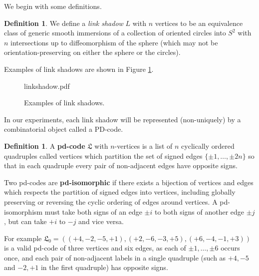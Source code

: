\documentclass[amsmath,secnumarabic,floatfix,amssymb,nofootinbib,nobibnotes,letterpaper,11pt,tightenlines,showkeys]{revtex4}
\theoremstyle{definition}
\newtheorem{definition}[theorem]{Definition}
\let\mgp=\marginpar \marginparwidth18mm \marginparsep1mm
\def\marginpar#1{\mgp{\raggedright\tiny #1}}
\let\lbl=\label
\def\label#1{\lbl{#1}\ifinner\else\marginpar{\ref{#1} #1}\ignorespaces\fi}
\begin{document}
We begin with some definitions.
\begin{definition}
We define a \emph{link shadow} $L$ with $n$ vertices to be an equivalence class of generic smooth immersions of a collection of oriented circles into $S^2$ with $n$ intersections up to diffeomorphism of the sphere (which may not be orientation-preserving on either the sphere or the circles).
\end{definition}
Examples of link shadows are shown in Figure \ref{fig:ShadowExamples}.
\begin{figure}
	\begin{overpic}[width=4in]{linkshadow.pdf}
	\end{overpic}
	\caption{\label{fig:ShadowExamples}Examples of link shadows.}
\end{figure}
In our experiments, each link shadow will be represented (non-uniquely) by a combinatorial object called a PD-code. 
\begin{definition}\label{def:PD}
A \textbf{pd-code} $\mathfrak{L}$ with $n$-vertices is a list of $n$ cyclically ordered quadruples called vertices which partition the set of signed edges $\{\pm 1,\dots, \pm 2n\}$ so that in each quadruple every pair of non-adjacent edges have opposite signs. 

Two pd-codes are \textbf{pd-isomorphic} if there exists a bijection of vertices and edges which respects the partition of signed edges into vertices, including globally preserving or reversing the cyclic ordering of edges around vertices. A pd-isomorphism must take both signs of an edge $\pm i$ to both signs of another edge $\pm j$, but can take $+i$ to $-j$ and vice versa. 
\end{definition}
For example $\mathfrak{L}_0 = ((+4,-2,-5,+1),(+2,-6,-3,+5),(+6,-4,-1,+3))$ is a valid pd-code of three vertices and six edges, as each of $\pm 1, \dots, \pm 6$ occurs once, and each pair of non-adjacent labels in a single quadruple (such as $+4,-5$ and $-2,+1$ in the first quadruple) has opposite signs. 
\end{document}
